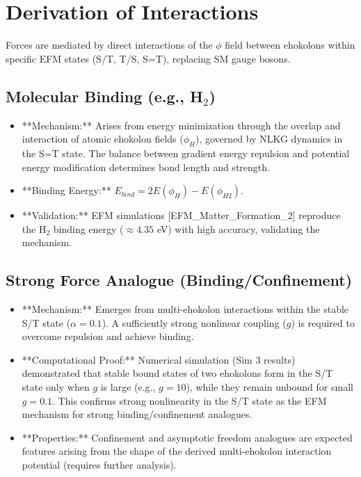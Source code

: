 \documentclass[11pt]{article}
\begin{document}
\section{Derivation of Interactions}
Forces are mediated by direct interactions of the \(\phi\) field between ehokolons within specific EFM states (S/T, T/S, S=T), replacing SM gauge bosons.

\subsection{Molecular Binding (e.g., H\(_2\))}
\begin{itemize}
    \item **Mechanism:** Arises from energy minimization through the overlap and interaction of atomic ehokolon fields (\(\phi_H\)), governed by NLKG dynamics in the S=T state. The balance between gradient energy repulsion and potential energy modification determines bond length and strength.
    \item **Binding Energy:** \(E_{bind} = 2E(\phi_H) - E(\phi_{H2})\).
    \item **Validation:** EFM simulations [EFM\_Matter\_Formation\_2] reproduce the H\(_2\) binding energy (\(\approx 4.35\) eV) with high accuracy, validating the mechanism.
\end{itemize}

\subsection{Strong Force Analogue (Binding/Confinement)}
\begin{itemize}
    \item **Mechanism:** Emerges from multi-ehokolon interactions within the stable S/T state (\(\alpha=0.1\)). A sufficiently strong nonlinear coupling (\(g\)) is required to overcome repulsion and achieve binding.
    \item **Computational Proof:** Numerical simulation (Sim 3 results) demonstrated that stable bound states of two ehokolons form in the S/T state only when \(g\) is large (e.g., \(g=10\)), while they remain unbound for small \(g=0.1\). This confirms strong nonlinearity in the S/T state as the EFM mechanism for strong binding/confinement analogues.
    \item **Properties:** Confinement and asymptotic freedom analogues are expected features arising from the shape of the derived multi-ehokolon interaction potential (requires further analysis).
\end{itemize}
\end{document}

